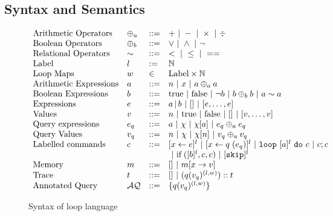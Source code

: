 
%
\subsection{Syntax and Semantics}
\label{appendixC:loop-syntax}
%
\begin{figure*}
\[
\begin{array}{llll}
 \mbox{Arithmetic Operators} & \oplus_a & ::= & + ~|~ - ~|~ \times 
%
~|~ \div \\  
  \mbox{Boolean Operators} & \oplus_b & ::= & \lor ~|~ \land ~|~ \neg\\
   \mbox{Relational Operators} & \sim & ::= & < ~|~ \leq ~|~ == \\  
 \mbox{Label} & l & := & \mathbb{N} \\ 
 \mbox{Loop Maps} & w & \in & \mbox{Label} \times \mathbb{N} \\
\mbox{Arithmetic Expressions} & \aexpr & ::= & 
	n ~|~ x ~|~ \aexpr \oplus_a \aexpr  \\
\mbox{Boolean Expressions} & \bexpr & ::= & 
	\etrue ~|~ \efalse  ~|~ \neg \bexpr
	 ~|~ \bexpr \oplus_b \bexpr
	~|~ \aexpr \sim \aexpr \\
\mbox{Expressions} & \expr & ::= & \aexpr \sep \bexpr ~|~ [] ~|~ [\expr, \dots, \expr] \\	
\mbox{Values} & v & ::= & n ~|~ \etrue ~|~ \efalse ~|~ [] ~|~ [v, \dots, v] \\
\mbox{Query expressions} & \expr_q & ::= & \aexpr ~|~ \chi ~|~ \chi[\aexpr] ~|~ \expr_q \oplus_a \expr_q \\
\mbox{Query Values} & v_q & ::= & n ~|~ \chi ~|~ \chi[n] ~|~ v_q \oplus_a  v_q \\
\mbox{Labelled commands} & c & ::= & 
[\assign x \expr]^{l} ~|~  [\assign x q(e_q)]^{l}
 ~|~  \eloop ~ [\aexpr]^{l} ~ \edo ~ c  ~|~ c;c \\
 & & & ~|~ \eif([\bexpr]^l, c, c) 	 ~|~ [\eskip]^{l} \\
\mbox{Memory} & m & ::= & [] ~|~ m[x \to v] \\
%
\mbox{Trace} & t & ::= & [] ~|~ (q(v_q)^{(l, w) }) :: t \\
\mbox{Annotated Query} & \mathcal{AQ}  & ::= & \{ q(v_q)^{(l,w)}  \}
\end{array}
\]
\caption{Syntax of loop language}
\label{appendixC:loop-syntax}
\end{figure*}
